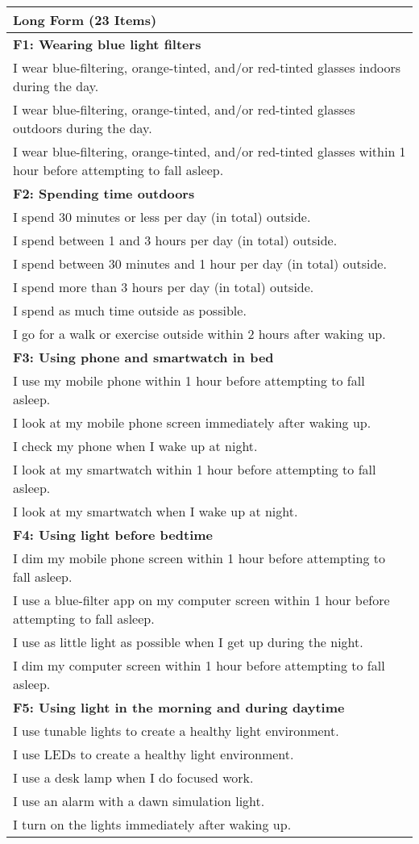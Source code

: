 \begin{appendix}
\begin{longtable}[]{@{}
  >{\raggedright\arraybackslash}p{}@{}}
\toprule
Long Form (23 Items) \\
\midrule
\endhead
\textbf{F1: Wearing blue light filters} \\
I wear blue-filtering, orange-tinted, and/or red-tinted glasses indoors
during the day. \\
I wear blue-filtering, orange-tinted, and/or red-tinted glasses outdoors
during the day. \\
I wear blue-filtering, orange-tinted, and/or red-tinted glasses within 1
hour before attempting to fall asleep. \\
\textbf{F2: Spending time outdoors} \\
I spend 30 minutes or less per day (in total) outside. \\
I spend between 1 and 3 hours per day (in total) outside. \\
I spend between 30 minutes and 1 hour per day (in total) outside. \\
I spend more than 3 hours per day (in total) outside. \\
I spend as much time outside as possible. \\
I go for a walk or exercise outside within 2 hours after waking up. \\
\textbf{F3: Using phone and smartwatch in bed} \\
I use my mobile phone within 1 hour before attempting to fall asleep. \\
I look at my mobile phone screen immediately after waking up. \\
I check my phone when I wake up at night. \\
I look at my smartwatch within 1 hour before attempting to fall
asleep. \\
I look at my smartwatch when I wake up at night. \\
\textbf{F4: Using light before bedtime} \\
I dim my mobile phone screen within 1 hour before attempting to fall
asleep. \\
I use a blue-filter app on my computer screen within 1 hour before
attempting to fall asleep. \\
I use as little light as possible when I get up during the night. \\
I dim my computer screen within 1 hour before attempting to fall
asleep. \\
\textbf{F5: Using light in the morning and during daytime} \\
I use tunable lights to create a healthy light environment. \\
I use LEDs to create a healthy light environment. \\
I use a desk lamp when I do focused work. \\
I use an alarm with a dawn simulation light. \\
I turn on the lights immediately after waking up. \\
\bottomrule
\end{longtable}


\end{appendix}
